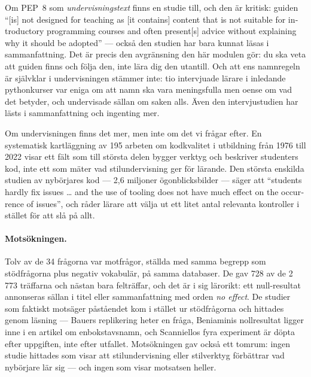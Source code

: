Om PEP~8 som \emph{undervisningstext} finns en studie till, och den är
kritisk: guiden \enquote{\foreignlanguage{english}{[is] not designed for
teaching as [it contains] content that is not suitable for introductory
programming courses and often present[s] advice without explaining why it
should be adopted}}\autocite[sammanfattningen]{Kirk2025DistillingPEP8}
--- också den studien har bara kunnat läsas i sammanfattning.  Det är
precis den avgränsning den här modulen gör: du ska veta att guiden finns
och följa den, inte lära dig den utantill.  Och att ens namnregeln är
självklar i undervisningen stämmer inte: tio intervjuade lärare i
inledande pythonkurser var eniga om att namn ska vara meningsfulla men
oense om vad det betyder, och undervisade sällan om saken
alls\autocite[sammanfattningen]{vanderWerf2024TeachersNaming}.  Även den
intervjustudien har lästs i sammanfattning och ingenting mer.

Om undervisningen finns det mer, men inte om det vi frågar efter.  En
systematisk kartläggning av 195 arbeten om kodkvalitet i utbildning från
1976 till 2022 visar ett fält som till största delen bygger verktyg och
beskriver studenters kod, inte ett som mäter vad stilundervisning ger för
lärande\autocite[avsnitt~5]{Keuning2023CodeQualityMapping}.  Den största
enskilda studien av nybörjares kod --- 2,6 miljoner ögonblicksbilder ---
säger att \enquote{\foreignlanguage{english}{students hardly fix issues
\dots{} and the use of tooling does not have much effect on the
occurrence of issues}}, och råder lärare att välja ut ett litet antal
relevanta kontroller i stället för att slå på
allt\autocite[sammanfattningen, avsnitt~6]{Keuning2017StudentCodeQuality}.

\paragraph{Motsökningen.}  Tolv av de 34 frågorna var
motfrågor, ställda med samma begrepp som stödfrågorna plus negativ
vokabulär, på samma databaser.  De gav 728 av de 2\,773 träffarna och
nästan bara felträffar, och det är i sig lärorikt: ett null-resultat
annonseras sällan i titel eller sammanfattning med orden \emph{no
effect}.  De studier som faktiskt motsäger påståendet kom i stället ur
stödfrågorna och hittades genom läsning --- Bauers replikering heter en
fråga, Beniaminis nollresultat ligger inne i en artikel om
enbokstavsnamn, och Scanniellos fyra experiment är döpta efter uppgiften,
inte efter utfallet.  Motsökningen gav också ett tomrum: ingen studie
hittades som visar att stilundervisning eller stilverktyg förbättrar vad
nybörjare lär sig --- och ingen som visar motsatsen heller.

